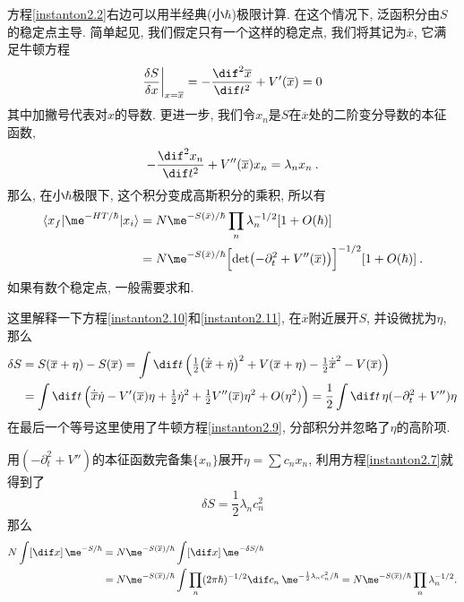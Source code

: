 方程\eqref{instanton2.2}右边可以用半经典(小$\hbar$)极限计算. 在这个情况下, 泛函积分由$S$的稳定点主导. 简单起见, 我们假定只有一个这样的稳定点, 我们将其记为$\overline{x}$, 它满足牛顿方程
\begin{equation}
    \frac{\delta S}{\delta x}\biggr\vert_{x=\overline{x}} = 
    -\frac{\dif^{2}\overline{x}}{\dif t^{2}} + V'(\overline{x}) = 0 \label{instanton2.9}
\end{equation} 
其中加撇号代表对$x$的导数. 更进一步, 我们令$x_{n}$是$S$在$\overline{x}$处的二阶变分导数的本征函数,
\begin{equation}
    -\frac{\dif^{2} x_{n}}{\dif t^{2}} + V''(\overline{x})x_{n} = \lambda_{n}x_{n} \:. \label{instanton2.10} 
\end{equation}
那么, 在小$\hbar$极限下, 这个积分变成高斯积分的乘积, 所以有
\begin{align}
    \langle x_{f} \vert \me^{-HT/\hbar} \vert x_{i}\rangle 
   & = N \me^{-S(\bar{x})/\hbar}\prod_{n}\lambda_{n}^{-1/2}[1+O(\hbar)] \nonumber \\
   &= N \me^{-S(\bar{x})/\hbar}\Bigl[\det\bigl(-\partial_{t}^{2}+V''(\overline{x})\bigr)\Bigr]^{-1/2}[1+O(\hbar)] \:. \label{instanton2.11}
\end{align}
如果有数个稳定点, 一般需要求和.
\begin{tcolorbox}
    这里解释一下方程\eqref{instanton2.10}和\eqref{instanton2.11}, 在$\overline{x}$附近展开$S$, 并设微扰为$\eta$, 那么
    \begin{align*}
        \delta S&= S(\overline{x}+\eta)-S(\overline{x}) 
        = \int \dif t\, \Bigl(\tfrac{1}{2}\bigl(\dot{\overline{x}}+\dot{\eta}\bigr)^{2}+V(\overline{x}+\eta)-\tfrac{1}{2}\dot{\overline{x}}^{2}-V(\overline{x})\Bigr) \\
        &=\int \dif t\,\Bigl(\dot{\overline{x}}\dot{\eta}- V'(\overline{x})\eta+\tfrac{1}{2}\dot{\eta}^{2}+\tfrac{1}{2}V''(\overline{x})\eta^{2}+O(\eta^{2})\Bigr)
        =\frac{1}{2}\int \dif t\, \eta(-\partial_{t}^{2}+V'')\eta
    \end{align*}
在最后一个等号这里使用了牛顿方程\eqref{instanton2.9}, 分部积分并忽略了$\eta$的高阶项. 

用$(-\partial_{t}^{2}+V'')$的本征函数完备集$\{x_{n}\}$展开$\eta=\sum c_{n}x_{n}$, 利用方程\eqref{instanton2.7}就得到了
\begin{equation*}
    \delta S= \frac{1}{2} \lambda_{n}c_{n}^{2}
\end{equation*}
那么
\begin{align*}
    N \int [\dif x]\, \me^{-S/\hbar}&=N \me^{-S(\overline{x})/\hbar} \int [\dif x]\, \me^{-\delta S/\hbar} \\
    &=N \me^{-S(\overline{x})/\hbar} \int \prod_{n} (2\pi\hbar)^{-1/2} \dif c_{n}\:\me^{-\frac{1}{2} \lambda_{n}c_{n}^{2}/\hbar}
    =N \me^{-S(\overline{x})/\hbar}\prod_{n} \lambda_{n}^{-1/2} .
\end{align*}
\end{tcolorbox}

